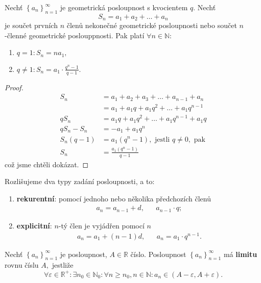 \begin{veta}
Nechť $\left \{ a_n \right \}_{n=1}^\infty $ je geometrická posloupnost s kvocientem
$q$. Nechť
$$S_n=a_1+a_2+\dots+a_n$$
je součet prvních $n$ členů nekonečné geometrické posloupnosti nebo součet
$n$-členné geometrické poslouppnosti. Pak platí $\forall n \in \mathbb N$:
\begin{enumerate}[$i.$]
\item $q=1: S_n=na_1,$
\item $q\ne 1: S_n = a_1\cdot \frac{q^n-1}{q-1}.$
\end{enumerate}
\end{veta}

\begin{proof}
\begin{align*}
    S_n &= a_1+a_2+a_3+\dots+a_{n-1}+a_n \\
    &= a_1 + a_1q+ a_1q^2+ \dots + a_1q^{n-1}\\
    qS_n &= a_1q + a_1q^2 +  \dots + a_1q^{n-1} + a_1q\\
    qS_n-S_n &= -a_1+a_1q^n\\
    S_n(q-1) &= a_1(q^n-1), \textrm{ jestli } q\ne 0, \textrm{ pak}\\
    S_n &= \frac{a_1(q^n-1)}{q-1}
\end{align*}
což jsme chtěli dokázat. \qedhere
\end{proof}

\begin{pozn}
    Rozlišujeme dva typy zadání posloupnosti, a to:
    \begin{enumerate}[$i.$]
    \item \textbf{rekurentní}: pomocí jednoho nebo několika předchozích členů
    \begin{align*}
        a_n=a_{n-1}+d, & & a_{n-1}\cdot q;
    \end{align*}
   	\item \textbf{explicitní}: $n$-tý člen je vyjádřen pomocí $n$
    \begin{align*}
        a_n=a_1+(n-1)d, & & a_n = a_1\cdot q^{n-1}.
    \end{align*}
    \end{enumerate}
\end{pozn}

\begin{definition}
Nechť $\left \{ a_n \right \}_{n=1}^\infty $ je posloupnost, $A\in \mathbb R$ číslo.
Posloupnost $\left \{ a_n \right \}_{n=1}^\infty $ má \textbf{limitu} rovnu číslu
$A,$ jestliže
$$\forall \varepsilon \in \mathbb R^+: \exists n_0 \in \mathbb N_0: \forall n \geq n_0,n \in \mathbb N: a_n\in(A-\varepsilon, A+\varepsilon).$$
\end{definition}


